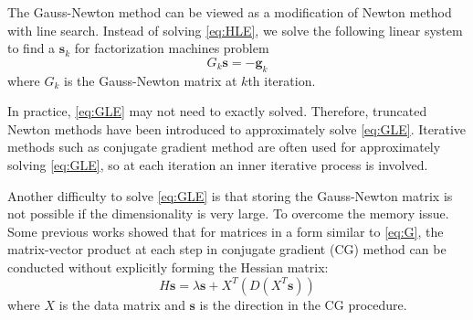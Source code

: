 \documentclass[11pt,twoside]{article}
\newcommand{\bsym}[1]{\ensuremath{\boldsymbol{#1}}}
\newcommand{\bs}{\ensuremath{\bsym{s}}}
\newcommand{\bg}{\ensuremath{\bsym{g}}}
\begin{document}
The Gauss-Newton method can be viewed as a modification of Newton method with line search. Instead of solving \eqref{eq:HLE}, we solve the following linear system to find a $\bs_k$ for factorization machines problem
\begin{equation}
	G_k\bs = -\bg_k
\label{eq:GLE}
\end{equation}
where $G_k$ is the Gauss-Newton matrix at $k$th iteration.


In practice, \eqref{eq:GLE} may not need to exactly solved. Therefore, truncated Newton methods have been introduced to approximately solve \eqref{eq:GLE}. Iterative methods such as conjugate gradient method are often used for approximately solving \eqref{eq:GLE}, so at each iteration an inner iterative process is involved.

Another difficulty to solve \eqref{eq:GLE} is that storing the Gauss-Newton matrix is not possible if the dimensionality is very large. To overcome the memory issue. 
Some previous works showed that for matrices in a form similar to \eqref{eq:G}, the matrix-vector product at each step in conjugate gradient (CG) method can be conducted without explicitly forming the Hessian matrix:
\begin{equation}
    H\bs = \lambda\bs + X^T(D(X^T\bs))
\label{eq:Hv}
\end{equation}
where $X$ is the data matrix and $\bs$ is the direction in the CG procedure. 
\end{document}
